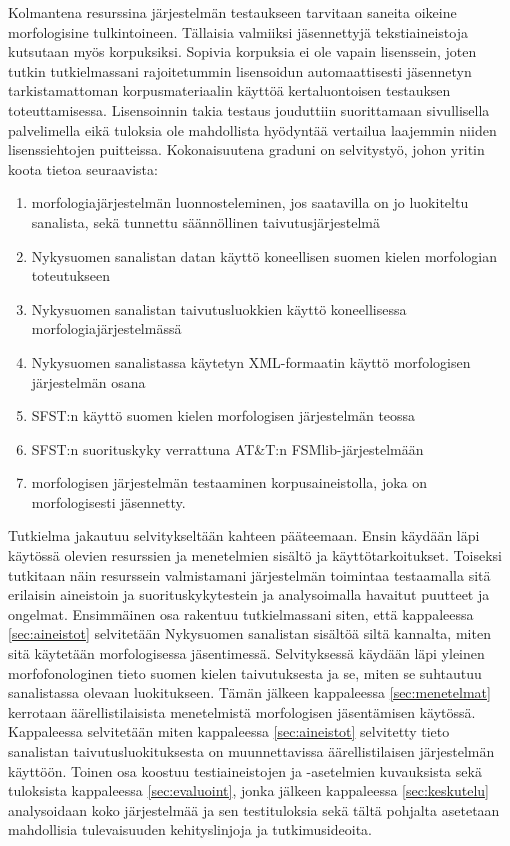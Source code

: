 \documentclass[free]{flammie}
\begin{document}
Kolmantena resurssina järjestelmän testaukseen tarvitaan saneita oikeine
morfologisine tulkintoineen. Tällaisia valmiiksi jäsennettyjä tekstiaineistoja
kutsutaan myös korpuksiksi. Sopivia korpuksia ei ole vapain lisenssein, joten
tutkin tutkielmassani rajoitetummin lisensoidun automaattisesti jäsennetyn
tarkistamattoman korpusmateriaalin käyttöä kertaluontoisen testauksen
toteuttamisessa. Lisensoinnin takia testaus jouduttiin suorittamaan sivullisella
palvelimella eikä tuloksia ole mahdollista hyödyntää vertailua laajemmin niiden
lisenssiehtojen puitteissa.  Kokonaisuutena graduni on selvitystyö, johon yritin
koota tietoa seuraavista:

\begin{enumerate}
    \item  morfologiajärjestelmän luonnosteleminen, jos saatavilla on jo luokiteltu sanalista, sekä tunnettu säännöllinen taivutusjärjestelmä
    \item Nykysuomen sanalistan datan käyttö koneellisen suomen kielen morfologian toteutukseen
    \item Nykysuomen sanalistan taivutusluokkien käyttö koneellisessa morfologiajärjestelmässä
    \item Nykysuomen sanalistassa käytetyn XML-formaatin käyttö morfologisen järjestelmän osana
    \item SFST:n käyttö suomen kielen morfologisen järjestelmän teossa
    \item SFST:n suorituskyky verrattuna AT\&T:n FSMlib-järjestelmään
    \item morfologisen järjestelmän testaaminen korpusaineistolla, joka on morfologisesti jäsennetty.
\end{enumerate}




Tutkielma jakautuu selvitykseltään kahteen pääteemaan. Ensin käydään läpi
käytössä olevien resurssien ja menetelmien sisältö ja käyttötarkoitukset.
Toiseksi tutkitaan näin resurssein valmistamani järjestelmän toimintaa
testaamalla sitä erilaisin aineistoin ja suorituskykytestein ja analysoimalla
havaitut puutteet ja ongelmat. Ensimmäinen osa rakentuu tutkielmassani siten,
että kappaleessa \ref{sec:aineistot} selvitetään Nykysuomen sanalistan sisältöä
siltä kannalta, miten sitä käytetään morfologisessa jäsentimessä. Selvityksessä
käydään läpi yleinen morfofonologinen tieto suomen kielen taivutuksesta ja se,
miten se suhtautuu sanalistassa olevaan luokitukseen. Tämän jälkeen kappaleessa
\ref{sec:menetelmat} kerrotaan äärellistilaisista menetelmistä morfologisen
jäsentämisen käytössä.  Kappaleessa selvitetään miten kappaleessa
\ref{sec:aineistot} selvitetty tieto sanalistan taivutusluokituksesta on
muunnettavissa äärellistilaisen järjestelmän käyttöön.  Toinen osa koostuu
testiaineistojen ja -asetelmien kuvauksista sekä tuloksista kappaleessa
\ref{sec:evaluoint}, jonka jälkeen kappaleessa \ref{sec:keskutelu} analysoidaan
koko järjestelmää ja sen testituloksia sekä tältä pohjalta asetetaan mahdollisia
tulevaisuuden kehityslinjoja ja tutkimusideoita.
\end{document}
